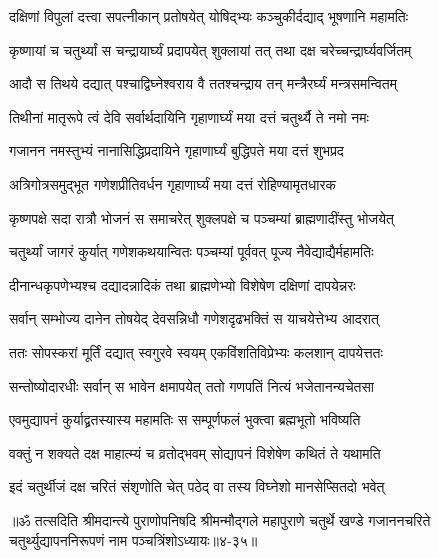 \twolineshloka
{दक्षिणां विपुलां दत्त्वा सपत्नीकान् प्रतोषयेत्}
{योषिद्भ्यः कञ्चुकीर्दद्याद् भूषणानि महामतिः} %

\twolineshloka
{कृष्णायां च चतुर्थ्यां स चन्द्रायार्घ्यं प्रदापयेत्}
{शुक्लायां तत् तथा दक्ष चरेच्चन्द्रार्घ्यवर्जितम्} %

\twolineshloka
{आदौ स तिथये दद्यात् पश्चाद्विघ्नेश्वराय वै}
{ततश्चन्द्राय तन् मन्त्रैरर्घ्यं मन्त्रसमन्वितम्} %

\twolineshloka
{तिथीनां मातृरूपे त्वं देवि सर्वार्थदायिनि}
{गृहाणार्घ्यं मया दत्तं चतुर्थ्यै ते नमो नमः} %

\twolineshloka
{गजानन नमस्तुभ्यं नानासिद्धिप्रदायिने}
{गृहाणार्घ्यं बुद्धिपते मया दत्तं शुभप्रद} %

\twolineshloka
{अत्रिगोत्रसमुद्भूत गणेशप्रीतिवर्धन}
{गृहाणार्घ्यं मया दत्तं रोहिण्यामृतधारक} %

\twolineshloka
{कृष्णपक्षे सदा रात्रौ भोजनं स समाचरेत्}
{शुक्लपक्षे च पञ्चम्यां ब्राह्मणादींस्तु भोजयेत्} %

\twolineshloka
{चतुर्थ्यां जागरं कुर्यात् गणेशकथयान्वितः}
{पञ्चम्यां पूर्ववत् पूज्य नैवेद्याद्यैर्महामतिः} %

\twolineshloka
{दीनान्धकृपणेभ्यश्च दद्यादन्नादिकं तथा}
{ब्राह्मणेभ्यो विशेषेण दक्षिणां दापयेन्नरः} %

\twolineshloka
{सर्वान् सम्भोज्य दानेन तोषयेद् देवसन्निधौ}
{गणेशदृढभक्तिं स याचयेत्तेभ्य आदरात्} %

\twolineshloka
{ततः सोपस्करां मूर्तिं दद्यात् स्वगुरवे स्वयम्}
{एकविंशतिविप्रेभ्यः कलशान् दापयेत्ततः} %

\twolineshloka
{सन्तोष्योदारधीः सर्वान् स भावेन क्षमापयेत्}
{ततो गणपतिं नित्यं भजेतानन्यचेतसा} %

\twolineshloka
{एवमुद्यापनं कुर्याद्व्रतस्यास्य महामतिः}
{स सम्पूर्णफलं भुक्त्वा ब्रह्मभूतो भविष्यति} %

\twolineshloka
{वक्तुं न शक्यते दक्ष माहात्म्यं च व्रतोद्भवम्}
{सोद्यापनं विशेषेण कथितं ते यथामति} %

\twolineshloka
{इदं चतुर्थीजं दक्ष चरितं संश‍ृणोति चेत्}
{पठेद् वा तस्य विघ्नेशो मानसेप्सितदो भवेत्} %

॥ॐ तत्सदिति श्रीमदान्त्ये पुराणोपनिषदि श्रीमन्मौद्गले महापुराणे चतुर्थे खण्डे गजाननचरिते चतुर्थ्युद्यापननिरूपणं नाम पञ्चत्रिंशोऽध्यायः॥४-३५॥
